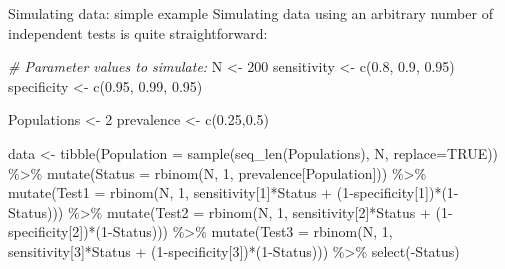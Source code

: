\documentclass[
  ignorenonframetext,
  aspectratio=169,
]{beamer}
\newenvironment{Shaded}{\begin{snugshade}}{\end{snugshade}}
\newcommand{\AttributeTok}[1]{\textcolor[rgb]{0.77,0.63,0.00}{#1}}
\newcommand{\CommentTok}[1]{\textcolor[rgb]{0.56,0.35,0.01}{\textit{#1}}}
\newcommand{\ConstantTok}[1]{\textcolor[rgb]{0.00,0.00,0.00}{#1}}
\newcommand{\DecValTok}[1]{\textcolor[rgb]{0.00,0.00,0.81}{#1}}
\newcommand{\FloatTok}[1]{\textcolor[rgb]{0.00,0.00,0.81}{#1}}
\newcommand{\FunctionTok}[1]{\textcolor[rgb]{0.00,0.00,0.00}{#1}}
\newcommand{\NormalTok}[1]{#1}
\newcommand{\OtherTok}[1]{\textcolor[rgb]{0.56,0.35,0.01}{#1}}
\newcommand{\SpecialCharTok}[1]{\textcolor[rgb]{0.00,0.00,0.00}{#1}}
\begin{document}
\begin{frame}[fragile]{Simulating data: simple example}
\protect\hypertarget{simulating-data-simple-example}{}
Simulating data using an arbitrary number of independent tests is quite
straightforward:

\scriptsize

\begin{Shaded}
\begin{Highlighting}[]
\CommentTok{\# Parameter values to simulate:}
\NormalTok{N }\OtherTok{\textless{}{-}} \DecValTok{200}
\NormalTok{sensitivity }\OtherTok{\textless{}{-}} \FunctionTok{c}\NormalTok{(}\FloatTok{0.8}\NormalTok{, }\FloatTok{0.9}\NormalTok{, }\FloatTok{0.95}\NormalTok{)}
\NormalTok{specificity }\OtherTok{\textless{}{-}} \FunctionTok{c}\NormalTok{(}\FloatTok{0.95}\NormalTok{, }\FloatTok{0.99}\NormalTok{, }\FloatTok{0.95}\NormalTok{)}

\NormalTok{Populations }\OtherTok{\textless{}{-}} \DecValTok{2}
\NormalTok{prevalence }\OtherTok{\textless{}{-}} \FunctionTok{c}\NormalTok{(}\FloatTok{0.25}\NormalTok{,}\FloatTok{0.5}\NormalTok{)}

\NormalTok{data }\OtherTok{\textless{}{-}} \FunctionTok{tibble}\NormalTok{(}\AttributeTok{Population =} \FunctionTok{sample}\NormalTok{(}\FunctionTok{seq\_len}\NormalTok{(Populations), N, }\AttributeTok{replace=}\ConstantTok{TRUE}\NormalTok{)) }\SpecialCharTok{\%\textgreater{}\%}
  \FunctionTok{mutate}\NormalTok{(}\AttributeTok{Status =} \FunctionTok{rbinom}\NormalTok{(N, }\DecValTok{1}\NormalTok{, prevalence[Population])) }\SpecialCharTok{\%\textgreater{}\%}
  \FunctionTok{mutate}\NormalTok{(}\AttributeTok{Test1 =} \FunctionTok{rbinom}\NormalTok{(N, }\DecValTok{1}\NormalTok{, sensitivity[}\DecValTok{1}\NormalTok{]}\SpecialCharTok{*}\NormalTok{Status }\SpecialCharTok{+}\NormalTok{ (}\DecValTok{1}\SpecialCharTok{{-}}\NormalTok{specificity[}\DecValTok{1}\NormalTok{])}\SpecialCharTok{*}\NormalTok{(}\DecValTok{1}\SpecialCharTok{{-}}\NormalTok{Status))) }\SpecialCharTok{\%\textgreater{}\%}
  \FunctionTok{mutate}\NormalTok{(}\AttributeTok{Test2 =} \FunctionTok{rbinom}\NormalTok{(N, }\DecValTok{1}\NormalTok{, sensitivity[}\DecValTok{2}\NormalTok{]}\SpecialCharTok{*}\NormalTok{Status }\SpecialCharTok{+}\NormalTok{ (}\DecValTok{1}\SpecialCharTok{{-}}\NormalTok{specificity[}\DecValTok{2}\NormalTok{])}\SpecialCharTok{*}\NormalTok{(}\DecValTok{1}\SpecialCharTok{{-}}\NormalTok{Status))) }\SpecialCharTok{\%\textgreater{}\%}
  \FunctionTok{mutate}\NormalTok{(}\AttributeTok{Test3 =} \FunctionTok{rbinom}\NormalTok{(N, }\DecValTok{1}\NormalTok{, sensitivity[}\DecValTok{3}\NormalTok{]}\SpecialCharTok{*}\NormalTok{Status }\SpecialCharTok{+}\NormalTok{ (}\DecValTok{1}\SpecialCharTok{{-}}\NormalTok{specificity[}\DecValTok{3}\NormalTok{])}\SpecialCharTok{*}\NormalTok{(}\DecValTok{1}\SpecialCharTok{{-}}\NormalTok{Status))) }\SpecialCharTok{\%\textgreater{}\%}
  \FunctionTok{select}\NormalTok{(}\SpecialCharTok{{-}}\NormalTok{Status)}
\end{Highlighting}
\end{Shaded}

\normalsize
\end{frame}
\end{document}
